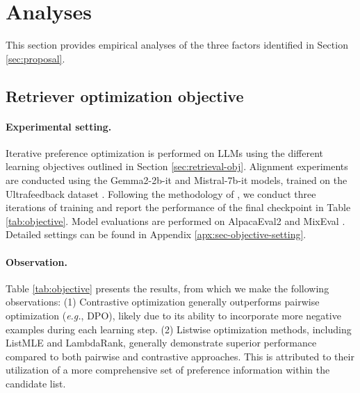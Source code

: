 
\section{Analyses}\label{sec:analysis}


This section provides empirical analyses of the three factors identified in Section \ref{sec:proposal}.  



\subsection{Retriever optimization objective}

\paragraph{Experimental setting.}
Iterative preference optimization is performed on LLMs using the different learning objectives outlined in Section \ref{sec:retrieval-obj}.
Alignment experiments are conducted using the Gemma2-2b-it \citep{team2024gemma} and Mistral-7b-it \citep{jiang2023mistral} models, trained on the Ultrafeedback dataset \citep{cui2024ultrafeedback}. 
Following the methodology of \citep{dong2024rlhf}, we conduct three iterations of training and report the performance of the final checkpoint in Table \ref{tab:objective}.  
Model evaluations are performed on AlpacaEval2 \citep{dubois2024length} and MixEval \citep{ni2024mixeval}. 
Detailed settings can be found in Appendix \ref{apx:sec-objective-setting}.


\paragraph{Observation.}
Table \ref{tab:objective} presents the results, from which we make the following observations: 
(1) Contrastive optimization generally outperforms pairwise optimization (\textit{e.g.}, DPO), likely due to its ability to incorporate more negative examples during each learning step. 
(2) Listwise optimization methods, including ListMLE and LambdaRank, generally demonstrate superior performance compared to both pairwise and contrastive approaches. 
This is attributed to their utilization of a more comprehensive set of preference information within the candidate list.


